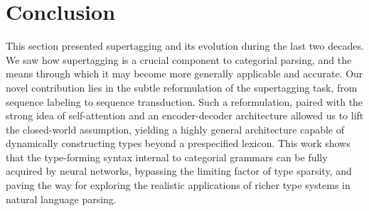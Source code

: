 \section{Conclusion} 
This section presented supertagging and its evolution during the last two decades.
We saw how supertagging is a crucial component to categorial parsing, and the means through which it may become more generally applicable and accurate.
Our novel contribution lies in the subtle reformulation of the supertagging task, from sequence labeling to sequence transduction.
Such a reformulation, paired with the strong idea of self-attention and an encoder-decoder architecture allowed us to lift the closed-world assumption, yielding a highly general architecture capable of dynamically constructing types beyond a prespecified lexicon.
This work shows that the type-forming syntax internal to categorial grammars can be fully acquired by neural networks, bypassing the limiting factor of type sparsity, and paving the way for exploring the realistic applications of richer type systems in natural language parsing.
